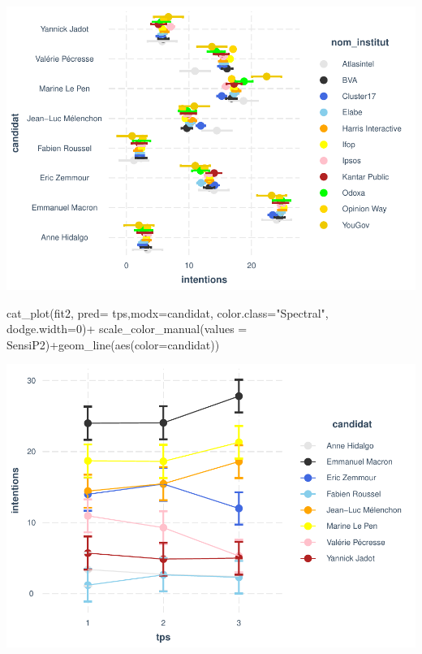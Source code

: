 \documentclass[
]{book}
\newenvironment{Shaded}{\begin{snugshade}}{\end{snugshade}}
\newcommand{\AttributeTok}[1]{\textcolor[rgb]{0.77,0.63,0.00}{#1}}
\newcommand{\DecValTok}[1]{\textcolor[rgb]{0.00,0.00,0.81}{#1}}
\newcommand{\FunctionTok}[1]{\textcolor[rgb]{0.00,0.00,0.00}{#1}}
\newcommand{\NormalTok}[1]{#1}
\newcommand{\SpecialCharTok}[1]{\textcolor[rgb]{0.00,0.00,0.00}{#1}}
\newcommand{\StringTok}[1]{\textcolor[rgb]{0.31,0.60,0.02}{#1}}
\begin{document}
\includegraphics{bookdown-demo_files/figure-latex/biais-1.pdf}

\begin{Shaded}
\begin{Highlighting}[]
\FunctionTok{cat\_plot}\NormalTok{(fit2, }\AttributeTok{pred=}\NormalTok{ tps,}\AttributeTok{modx=}\NormalTok{candidat, }\AttributeTok{color.class=}\StringTok{"Spectral"}\NormalTok{, }\AttributeTok{dodge.width=}\DecValTok{0}\NormalTok{)}\SpecialCharTok{+}
  \FunctionTok{scale\_color\_manual}\NormalTok{(}\AttributeTok{values =}\NormalTok{ SensiP2)}\SpecialCharTok{+}\FunctionTok{geom\_line}\NormalTok{(}\FunctionTok{aes}\NormalTok{(}\AttributeTok{color=}\NormalTok{candidat))}
\end{Highlighting}
\end{Shaded}

\includegraphics{bookdown-demo_files/figure-latex/biais-2.pdf}
\end{document}
